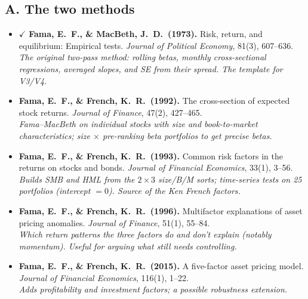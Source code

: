 \documentclass[11pt]{article}
\begin{document}
\subsection*{A. The two methods}
\begin{itemize}
  \item $\checkmark$ \textbf{Fama, E.\ F., \& MacBeth, J.\ D.\ (1973).} Risk, return, and equilibrium: Empirical tests. \emph{Journal of Political Economy}, 81(3), 607--636.\\
  \textit{The original two-pass method: rolling betas, monthly cross-sectional regressions, averaged slopes, and SE from their spread. The template for V3/V4.}
  \item \textbf{Fama, E.\ F., \& French, K.\ R.\ (1992).} The cross-section of expected stock returns. \emph{Journal of Finance}, 47(2), 427--465.\\
  \textit{Fama--MacBeth on individual stocks with size and book-to-market characteristics; size $\times$ pre-ranking beta portfolios to get precise betas.}
  \item \textbf{Fama, E.\ F., \& French, K.\ R.\ (1993).} Common risk factors in the returns on stocks and bonds. \emph{Journal of Financial Economics}, 33(1), 3--56.\\
  \textit{Builds SMB and HML from the $2\times3$ size/B/M sorts; time-series tests on 25 portfolios (intercept $=0$). Source of the Ken French factors.}
  \item \textbf{Fama, E.\ F., \& French, K.\ R.\ (1996).} Multifactor explanations of asset pricing anomalies. \emph{Journal of Finance}, 51(1), 55--84.\\
  \textit{Which return patterns the three factors do and don't explain (notably momentum). Useful for arguing what still needs controlling.}
  \item \textbf{Fama, E.\ F., \& French, K.\ R.\ (2015).} A five-factor asset pricing model. \emph{Journal of Financial Economics}, 116(1), 1--22.\\
  \textit{Adds profitability and investment factors; a possible robustness extension.}
\end{itemize}
\end{document}
